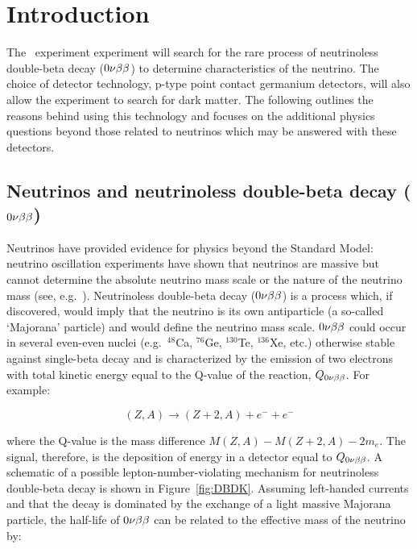 
\chapter{Introduction}
	\label{chap:IntroChapter}

	The \MJ~experiment experiment will search for the rare process of 
neutrinoless double-beta decay ($0 \nu \beta \beta$) to determine characteristics of the neutrino.  The 
choice of detector technology, p-type point contact germanium detectors, 
will also allow the experiment to search for dark matter.  
The following outlines the reasons behind using this technology and focuses on the
additional physics questions beyond those related to neutrinos which may be answered with these detectors.

	\section{Neutrinos and neutrinoless double-beta decay ($0 \nu \beta \beta$)}
	
	Neutrinos have provided evidence for physics beyond the Standard Model: 
neutrino oscillation experiments have shown that neutrinos are massive but
cannot determine the absolute neutrino mass scale or the nature of the neutrino
mass (see, e.g.~\cite{Mes04}).  Neutrinoless double-beta decay ($0 \nu \beta \beta$) is a
process which, if discovered, would imply that the neutrino is its own
antiparticle (a so-called `Majorana' particle) and would define the neutrino
mass scale.  $0 \nu \beta \beta$ could occur in several even-even nuclei (e.g.~$^{48}$Ca,
$^{76}$Ge, $^{130}$Te, $^{136}$Xe, etc.) otherwise stable against
single-beta decay and is characterized by the emission of two electrons with
total kinetic energy equal to the Q-value of the reaction, $Q_{0 \nu \beta \beta}$.  For example:

		\begin{equation}
		(Z,A) \rightarrow (Z+2,A) + e^- + e^-
		\end{equation} 

where the Q-value is the mass difference $M(Z,A)-M(Z+2,A)-2m_e$.  The signal, therefore, 
is the deposition of energy in a detector equal to $Q_{0 \nu \beta \beta}$.
A schematic of a possible lepton-number-violating mechanism for neutrinoless double-beta
decay is shown in Figure~\ref{fig:DBDK}.  Assuming left-handed currents and
that the decay is dominated by the exchange of a light massive Majorana
particle, the half-life of $0 \nu \beta \beta$ can be related to the effective mass of
the neutrino by:

